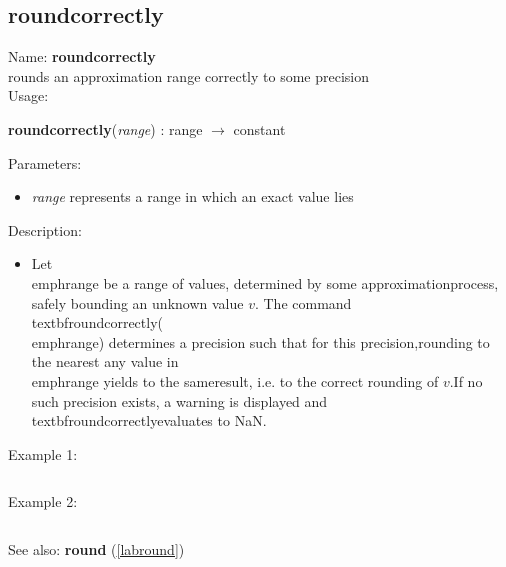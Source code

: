 \subsection{roundcorrectly}
\label{labroundcorrectly}
\noindent Name: \textbf{roundcorrectly}\\
rounds an approximation range correctly to some precision\\
\noindent Usage: 
\begin{center}
\textbf{roundcorrectly}(\emph{range}) : \textsf{range} $\rightarrow$ \textsf{constant}\\
\end{center}
Parameters: 
\begin{itemize}
\item \emph{range} represents a range in which an exact value lies
\end{itemize}
\noindent Description: \begin{itemize}

\item Let \\emph{range} be a range of values, determined by some approximation\n   process, safely bounding an unknown value $v$. The command\n   \\textbf{roundcorrectly}(\\emph{range}) determines a precision such that for this precision,\n   rounding to the nearest any value in \\emph{range} yields to the same\n   result, i.e. to the correct rounding of $v$.\n    \n   If no such precision exists, a warning is displayed and \\textbf{roundcorrectly}\n   evaluates to NaN.\n\end{itemize}
\noindent Example 1: 
\begin{center}\begin{minipage}{15cm}\begin{Verbatim}[frame=single]
\end{Verbatim}
\end{minipage}\end{center}
\noindent Example 2: 
\begin{center}\begin{minipage}{15cm}\begin{Verbatim}[frame=single]
\end{Verbatim}
\end{minipage}\end{center}
See also: \textbf{round} (\ref{labround})
